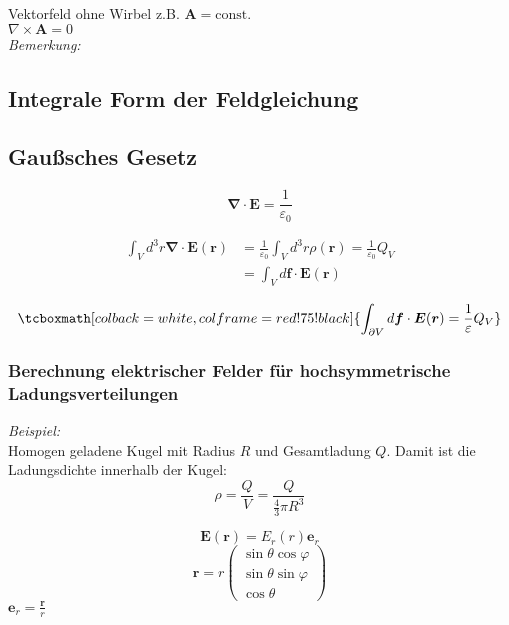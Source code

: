 \documentclass[titlepage,11pt,a4paper,ngerman]{report}
\newcommand{\tx}[1]{\textrm{#1}}
\newcommand{\const}{\tx{const.}}
\renewcommand{\vec}[1]{\boldsymbol{#1}}
\renewcommand{\epsilon}{\varepsilon}
\newcommand{\bem}{\emph{Bemerkung:}}
\newcommand{\rmbox}[1]{\tcboxmath[colback=white,colframe=red!75!black]{#1}}
\begin{document}
Vektorfeld ohne Wirbel z.B. $\vec{A} = \const$\\
$\nabla \times \vec{A} = 0$\\
\bem  %

\subsection{Integrale Form der Feldgleichung}
\subsection{Gaußsches Gesetz}
\begin{equation*}
\vec{\nabla} \cdot \vec{E} = \frac{1}{\epsilon_0}
\end{equation*}


\begin{align*}
\int_{V} d^3 r \vec{\nabla} \cdot \vec{E}(\vec{r}) &= \frac{1}{\epsilon_0} \int_{V} d^3 r \rho (\vec{r}) = \frac{1}{\epsilon_0} Q_V\\
&= \int_V d\vec{f} \cdot \vec{E}(\vec{r})
\end{align*}

\begin{equation*}
\rmbox{\int_{\partial V} d \vec{f} \cdot \vec{E}(\vec{r}) = \frac{1}{\epsilon} Q_V}
\end{equation*}

\subsubsection{Berechnung elektrischer Felder für hochsymmetrische Ladungsverteilungen}
\emph{Beispiel:}\\
Homogen geladene Kugel mit Radius $ R $ und Gesamtladung $ Q $. Damit ist die Ladungsdichte innerhalb der Kugel:
\begin{equation*}
\rho = \frac{Q}{V} = \frac{Q}{\frac{4}{3} \pi R^3}
\end{equation*}


\begin{equation*}
\vec{E}(\vec{r}) = E_r (r) \vec{e}_r
\end{equation*}
\begin{equation*}
\vec{r} = r \begin{pmatrix}
\sin \theta \cos \varphi \\ \sin \theta \sin \varphi \\ \cos \theta
\end{pmatrix}
\end{equation*}
$ \vec{e}_r = \frac{\vec{r}}{r} $
\end{document}
